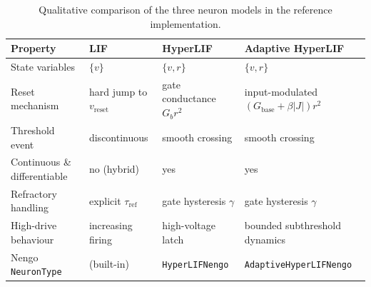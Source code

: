 \begin{table}[t]
\centering
\caption{Qualitative comparison of the three neuron models in the reference implementation.}
\label{tab:modelcompare}
\small
\begin{tabular}{p{} p{} p{} p{}}
\toprule
Property & LIF & HyperLIF & Adaptive HyperLIF \\
\midrule
State variables & $\{v\}$ & $\{v, r\}$ & $\{v, r\}$ \\
Reset mechanism & hard jump to $v_{\mathrm{reset}}$ & gate conductance $G_b r^2$ & input-modulated $(G_{\mathrm{base}}+\beta|J|)r^2$ \\
Threshold event & discontinuous & smooth crossing & smooth crossing \\
Continuous \& differentiable & no (hybrid) & yes & yes \\
Refractory handling & explicit $\tau_{\mathrm{ref}}$ & gate hysteresis $\gamma$ & gate hysteresis $\gamma$ \\
High-drive behaviour & increasing firing & high-voltage latch & bounded subthreshold dynamics \\
Nengo \texttt{NeuronType} & (built-in) & \texttt{HyperLIFNengo} & \texttt{AdaptiveHyperLIFNengo} \\
\bottomrule
\end{tabular}
\end{table}
